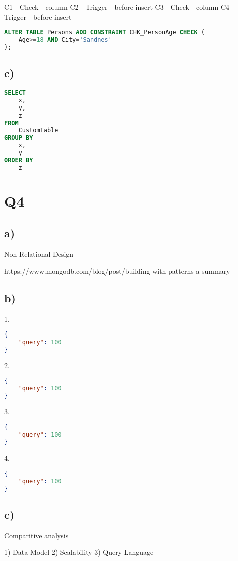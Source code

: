 \documentclass{article}
\begin{document}
C1 - Check - column
C2 - Trigger - before insert
C3 - Check - column
C4 - Trigger - before insert
\begin{lstlisting}[language=sql]
ALTER TABLE Persons ADD CONSTRAINT CHK_PersonAge CHECK (
    Age>=18 AND City='Sandnes'
);
\end{lstlisting}

\subsection*{\small c)}

\begin{lstlisting}[language=sql]
SELECT 
    x,
    y,
    z
FROM 
    CustomTable 
GROUP BY 
    x,
    y
ORDER BY
    z
\end{lstlisting}

\section*{Q4}

\subsection*{\small a)}

Non Relational Design

https://www.mongodb.com/blog/post/building-with-patterns-a-summary

\subsection*{\small b)}

\hspace{0cm}1.
\begin{lstlisting}[language=json]
{
    "query": 100
} 
\end{lstlisting} 
\hspace{0cm}2.
\begin{lstlisting}[language=json]
{                   
    "query": 100
}
\end{lstlisting}
\hspace{0cm}3. 
\begin{lstlisting}[language=json]
{
    "query": 100
}
\end{lstlisting}
\hspace{0cm}4. 
\begin{lstlisting}[language=json]
{
    "query": 100
}
\end{lstlisting}

\subsection*{\small c)}

Comparitive analysis

1) Data Model
2) Scalability
3) Query Language
\end{document}
